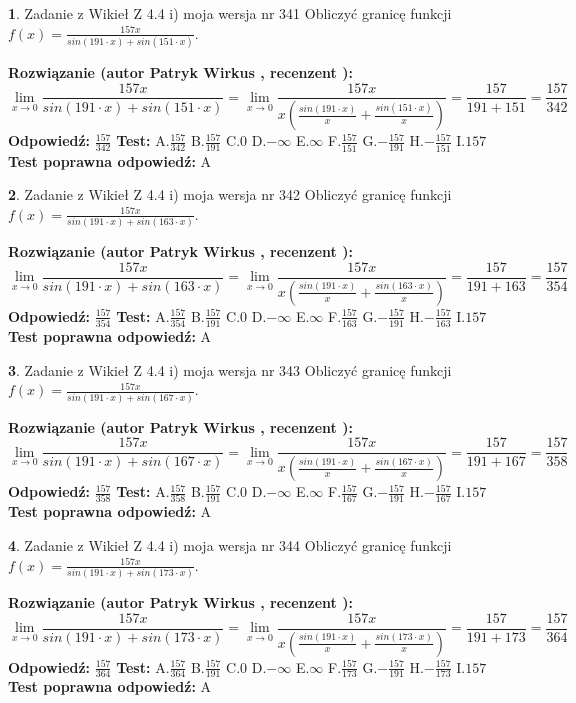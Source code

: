 \documentclass[12pt, a4paper]{article}
\theoremstyle{definition} %
\newtheorem{zad}{}
\newcommand{\zadStart}[1]{\begin{zad}#1\newline}
\newcommand{\zadStop}{\end{zad}}
\newcommand{\rozwStart}[2]{\noindent \textbf{Rozwiązanie (autor #1 , recenzent #2): }\newline}
\newcommand{\rozwStop}{\newline}
\newcommand{\odpStart}{\noindent \textbf{Odpowiedź:}\newline}
\newcommand{\odpStop}{\newline}
\newcommand{\testStart}{\noindent \textbf{Test:}\newline}
\newcommand{\testStop}{\newline}
\newcommand{\kluczStart}{\noindent \textbf{Test poprawna odpowiedź:}\newline}
\newcommand{\kluczStop}{\newline}
\begin{document}
\zadStart{Zadanie z Wikieł Z 4.4 i) moja wersja nr 341}
Obliczyć granicę funkcji $f(x)=\frac{157x}{sin(191\cdot x) +sin(151\cdot x)}$.
\zadStop
\rozwStart{Patryk Wirkus}{}
$$\lim\limits_{x\to 0}\frac{157x}{sin(191\cdot x) +sin(151\cdot x)}=\lim\limits_{x\to 0}\frac{157x}{x(\frac{sin(191\cdot x)}{x}+\frac{sin(151\cdot x)}{x})}=\frac{157}{191+151} = \frac{157}{342}$$
\rozwStop
\odpStart
$\frac{157}{342}$
\odpStop
\testStart
A.$\frac{157}{342}$
B.$\frac{157}{191}$
C.$0$
D.$-\infty$
E.$\infty$
F.$\frac{157}{151}$
G.$-\frac{157}{191}$
H.$-\frac{157}{151}$
I.$157$
\testStop
\kluczStart
A
\kluczStop



\zadStart{Zadanie z Wikieł Z 4.4 i) moja wersja nr 342}
Obliczyć granicę funkcji $f(x)=\frac{157x}{sin(191\cdot x) +sin(163\cdot x)}$.
\zadStop
\rozwStart{Patryk Wirkus}{}
$$\lim\limits_{x\to 0}\frac{157x}{sin(191\cdot x) +sin(163\cdot x)}=\lim\limits_{x\to 0}\frac{157x}{x(\frac{sin(191\cdot x)}{x}+\frac{sin(163\cdot x)}{x})}=\frac{157}{191+163} = \frac{157}{354}$$
\rozwStop
\odpStart
$\frac{157}{354}$
\odpStop
\testStart
A.$\frac{157}{354}$
B.$\frac{157}{191}$
C.$0$
D.$-\infty$
E.$\infty$
F.$\frac{157}{163}$
G.$-\frac{157}{191}$
H.$-\frac{157}{163}$
I.$157$
\testStop
\kluczStart
A
\kluczStop



\zadStart{Zadanie z Wikieł Z 4.4 i) moja wersja nr 343}
Obliczyć granicę funkcji $f(x)=\frac{157x}{sin(191\cdot x) +sin(167\cdot x)}$.
\zadStop
\rozwStart{Patryk Wirkus}{}
$$\lim\limits_{x\to 0}\frac{157x}{sin(191\cdot x) +sin(167\cdot x)}=\lim\limits_{x\to 0}\frac{157x}{x(\frac{sin(191\cdot x)}{x}+\frac{sin(167\cdot x)}{x})}=\frac{157}{191+167} = \frac{157}{358}$$
\rozwStop
\odpStart
$\frac{157}{358}$
\odpStop
\testStart
A.$\frac{157}{358}$
B.$\frac{157}{191}$
C.$0$
D.$-\infty$
E.$\infty$
F.$\frac{157}{167}$
G.$-\frac{157}{191}$
H.$-\frac{157}{167}$
I.$157$
\testStop
\kluczStart
A
\kluczStop



\zadStart{Zadanie z Wikieł Z 4.4 i) moja wersja nr 344}
Obliczyć granicę funkcji $f(x)=\frac{157x}{sin(191\cdot x) +sin(173\cdot x)}$.
\zadStop
\rozwStart{Patryk Wirkus}{}
$$\lim\limits_{x\to 0}\frac{157x}{sin(191\cdot x) +sin(173\cdot x)}=\lim\limits_{x\to 0}\frac{157x}{x(\frac{sin(191\cdot x)}{x}+\frac{sin(173\cdot x)}{x})}=\frac{157}{191+173} = \frac{157}{364}$$
\rozwStop
\odpStart
$\frac{157}{364}$
\odpStop
\testStart
A.$\frac{157}{364}$
B.$\frac{157}{191}$
C.$0$
D.$-\infty$
E.$\infty$
F.$\frac{157}{173}$
G.$-\frac{157}{191}$
H.$-\frac{157}{173}$
I.$157$
\testStop
\kluczStart
A
\kluczStop
\end{document}
